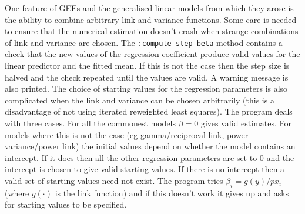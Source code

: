 \documentclass[10pt]{article}
\begin{document}
One feature of GEEs and the generalised linear models from which they arose is the ability to combine arbitrary link and variance functions. Some care is needed to ensure that the numerical estimation doesn't crash when strange combinations of link and variance are chosen.   The \texttt{:compute-step-beta} method contains a check that the new values of the regression coefficient produce valid values for the linear predictor and the fitted mean. If this is not the case then the step size is halved and the check repeated until the values are valid. A warning message is also printed. 
 The choice of starting values for the regression parameters is also complicated when the link and variance can be chosen arbitrarily (this is a disadvantage of not using iterated reweighted least squares).  The program deals with three cases.  For all the commonest models $\beta=0$ gives valid estimates. For models where this is not the case (eg gamma/reciprocal link, power variance/power link) the initial values depend on whether the model contains an intercept. If it does then all the other regression parameters are set to 0 and the intercept is chosen to give valid starting values.  If there is no intercept then a valid set of starting values need not exist. The program tries $\beta_i={g(\bar y)}/{p\bar x_i}$ (where $g(\cdot)$ is the link function) and if this doesn't work it gives up and asks for starting values to be specified.  
\end{document}
